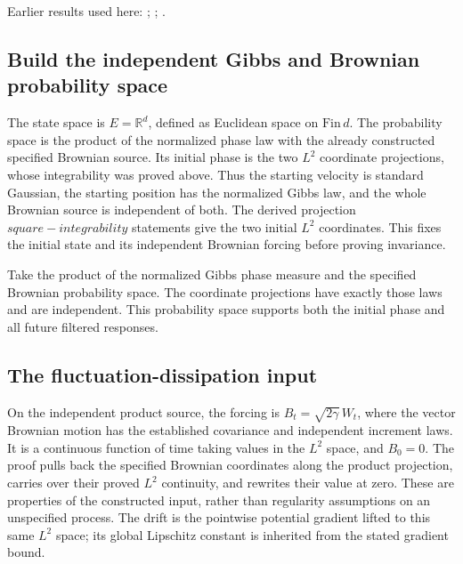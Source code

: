 \documentclass[11pt,a4paper]{report}
\begin{document}
Earlier results used here: \cite[Section~3.26.13]{LangevinLean2026ULASC}; \cite[Section~3.26.15]{LangevinLean2026ULASC}; \cite[Section~3.26.3]{LangevinLean2026ULASC}.
\subsection{\texorpdfstring{Build the independent Gibbs and Brownian probability space}{Build the independent Gibbs and Brownian probability space}}
\label{report-step-KineticLangevin-CanonicalStationarity-lean-2}


The state space is \(E=\mathbb R^d\), defined as Euclidean space on \(\mathrm{Fin}\,d\). The probability space is the product of the normalized phase law with the already constructed specified Brownian source. Its initial phase is the two \(L^{2}\) coordinate projections, whose integrability was proved above. Thus the starting velocity is standard Gaussian, the starting position has the normalized Gibbs law, and the whole Brownian source is independent of both. The derived projection \(square-integrability\) statements give the two initial \(L^{2}\) coordinates. This fixes the initial state and its independent Brownian forcing before proving invariance.



Take the product of the normalized Gibbs phase measure and the specified Brownian probability space. The coordinate projections have exactly those laws and are independent. This probability space supports both the initial phase and all future filtered responses.

\subsection{\texorpdfstring{The fluctuation-dissipation input}{The fluctuation-dissipation input}}
\label{report-step-KineticLangevin-CanonicalStationarity-lean-3}


On the independent product source, the forcing is \(B_t=\sqrt{2\gamma}\,W_t\), where the vector Brownian motion has the established covariance and independent increment laws. It is a continuous function of time taking values in the \(L^{2}\) space, and \(B_0=0\). The proof pulls back the specified Brownian coordinates along the product projection, carries over their proved \(L^{2}\) continuity, and rewrites their value at zero. These are properties of the constructed input, rather than regularity assumptions on an unspecified process. The drift is the pointwise potential gradient lifted to this same \(L^{2}\) space; its global Lipschitz constant is inherited from the stated gradient bound.
\end{document}
